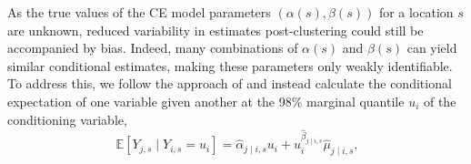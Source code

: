 \documentclass[12pt]{article}
\DeclareMathOperator{\CE}{\mathrm{CE}}
\begin{document}
As the true values of the CE model parameters $(\alpha(s), \beta(s))$ for a location $s$ are unknown, reduced variability in estimates post-clustering could still be accompanied by bias. 
Indeed, many combinations of $\alpha(s)$ and $\beta(s)$ can yield similar conditional estimates, making these parameters only weakly identifiable. 
To address this, we follow the approach of \citet{Richards2021-qm} and instead calculate the conditional expectation of one variable given another at the 98\% marginal quantile $u_i$ of the conditioning variable,  
\begin{equation}~\label{eq:boot}
  \mathbb{E}[Y_{j, s} \mid Y_{i, s} = u_i] = \hat{\alpha}_{j \mid i, s} u_i + u_i^{\hat{\beta}_{j \mid i, s}} \hat{\mu}_{j \mid i, s},
\end{equation}
\end{document}
